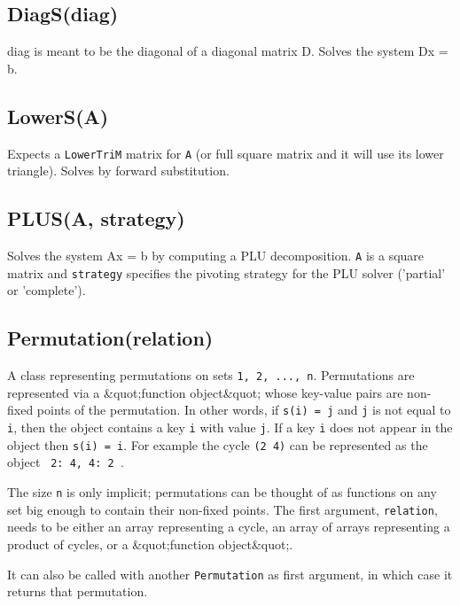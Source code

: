 \documentclass{article}
\begin{document}
    \subsection*{DiagS(diag)}
    diag is meant to be the diagonal of a diagonal matrix D.
Solves the system Dx = b.


    \subsection*{LowerS(A)}
    Expects a \texttt{LowerTriM} matrix for \texttt{A} (or full square matrix and it will use its lower triangle).
Solves by forward substitution.


    \subsection*{PLUS(A, strategy)}
    Solves the system Ax = b by computing a PLU decomposition.
\texttt{A} is a square matrix and \texttt{strategy} specifies the pivoting
strategy for the PLU solver ('partial' or 'complete').


    \subsection*{Permutation(relation)}
    A class representing permutations on sets \texttt{{1, 2, ..., n}}. Permutations are
represented via a \&quot;function object\&quot; whose key-value pairs are non-fixed points of
the permutation. In other words, if \texttt{s(i) = j} and \texttt{j} is not equal to \texttt{i}, then
the object contains a key \texttt{i} with value \texttt{j}. If a key \texttt{i} does not appear in the
object then \texttt{s(i) = i}. For example the cycle \texttt{(2 4)} can be represented as the
object \texttt{{ 2: 4, 4: 2 }}.


The size \texttt{n} is only implicit; permutations can be thought of as functions on any
set big enough to contain their non-fixed points.
The first argument, \texttt{relation}, needs to be either an array representing a cycle,
an array of arrays representing a product of cycles, or a \&quot;function object\&quot;.


It can also be called with another \texttt{Permutation} as first argument, in which case
it returns that permutation.
\end{document}
